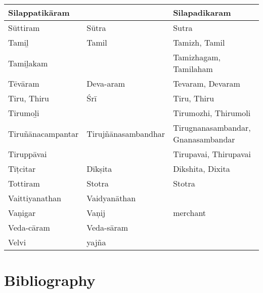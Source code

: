 \begin{longtable}{|l|l|l|}
\hline
Silappatikāram &  & Silapadikaram \\
\hline
Sūttiram & Sūtra & Sutra \\
\hline
Tamiḻ & Tamil & Tamizh, Tamil \\
\hline
Tamiḻakam &  & Tamizhagam, Tamilaham \\
\hline
Tēvāram & Deva-aram & Tevaram, Devaram \\
\hline
Tiru, Thiru & Śrī & Tiru, Thiru \\
\hline
Tirumoḻi &  & Tirumozhi, Thirumoli \\
\hline
Tiruñānacampantar & Tirujñānasambandhar & Tirugnanasambandar, Gnanasambandar \\
\hline
Tiruppāvai &  & Tirupavai, Thirupavai \\
\hline
Tīṭcitar & Dīkṣita & Dikshita, Dixita \\
\hline
Tottiram & Stotra & Stotra \\
\hline
Vaittiyanathan & Vaidyanāthan &  \\
\hline
Vaņigar & Vaņij & merchant \\
\hline
Veda-cāram & Veda-sāram  &  \\
\hline
Velvi & yajña &  \\
\hline
\end{longtable}


\section*{Bibliography}

